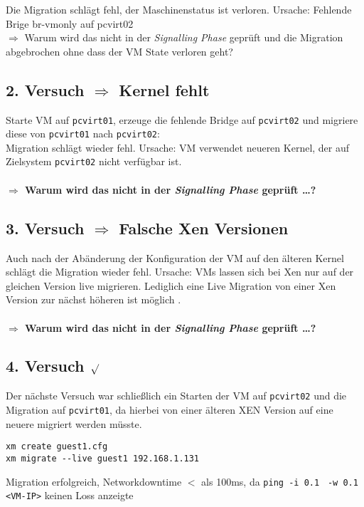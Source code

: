 Die Migration schlägt fehl, der Maschinenstatus ist verloren. Ursache: Fehlende Brige br-vmonly auf pcvirt02
\\
$\Rightarrow$ Warum wird das nicht in der \emph{Signalling Phase} geprüft und die Migration abgebrochen ohne dass der VM State verloren geht? 

\subsection {2. Versuch $\Rightarrow$ Kernel fehlt}
Starte VM auf \verb#pcvirt01#, erzeuge die fehlende Bridge auf \verb#pcvirt02# und migriere diese von \verb#pcvirt01# nach \verb#pcvirt02#:
\\
Migration schlägt wieder fehl. Ursache: VM verwendet neueren Kernel, der auf Zielsystem \verb#pcvirt02# nicht verfügbar ist.
\\
\\
\large
\textbf{$\Rightarrow$ Warum wird das nicht in der \emph{Signalling Phase} geprüft \dots?}
\normalsize

\subsection {3. Versuch $\Rightarrow$ Falsche Xen Versionen}
Auch nach der Abänderung der Konfiguration der VM auf den älteren Kernel schlägt die Migration wieder fehl. Ursache: VMs lassen sich bei Xen nur auf der gleichen Version live migrieren. Lediglich eine Live Migration von einer Xen Version zur nächst höheren ist möglich \cite{wiki_xen_version}.
\\
\\
\Large
\textbf{$\Rightarrow$ Warum wird das nicht in der \emph{Signalling Phase} geprüft \dots?}
\normalsize

\subsection {4. Versuch $\surd$ }
Der nächste Versuch war schließlich ein Starten der VM auf \verb#pcvirt02# und die Migration auf \verb#pcvirt01#, da hierbei von einer älteren XEN Version auf eine neuere migriert werden müsste.
\setupVerbatimOut
\begin{verbatim} 
xm create guest1.cfg
xm migrate --live guest1 192.168.1.131
\end{verbatim}

Migration erfolgreich, Networkdowntime $<$ als 100ms, da \verb|ping -i 0.1| \verb| -w 0.1 <VM-IP>| keinen Loss anzeigte

